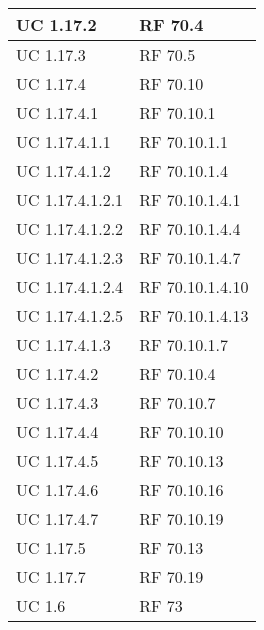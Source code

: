 {\begin{longtable} [c]{| p{4cm} | p{4cm} |}
 \hline 
UC 1.17.2 & RF 70.4\\ 
 \hline 
UC 1.17.3 & RF 70.5\\ 
 \hline 
UC 1.17.4 & RF 70.10\\ 
 \hline 
UC 1.17.4.1 & RF 70.10.1\\ 
 \hline 
UC 1.17.4.1.1 & RF 70.10.1.1\\ 
 \hline 
UC 1.17.4.1.2 & RF 70.10.1.4\\ 
 \hline 
UC 1.17.4.1.2.1 & RF 70.10.1.4.1\\ 
 \hline 
UC 1.17.4.1.2.2 & RF 70.10.1.4.4\\ 
 \hline 
UC 1.17.4.1.2.3 & RF 70.10.1.4.7\\ 
 \hline 
UC 1.17.4.1.2.4 & RF 70.10.1.4.10\\ 
 \hline 
UC 1.17.4.1.2.5 & RF 70.10.1.4.13\\ 
 \hline 
UC 1.17.4.1.3 & RF 70.10.1.7\\ 
 \hline 
UC 1.17.4.2 & RF 70.10.4\\ 
 \hline 
UC 1.17.4.3 & RF 70.10.7\\ 
 \hline 
UC 1.17.4.4 & RF 70.10.10\\ 
 \hline 
UC 1.17.4.5 & RF 70.10.13\\ 
 \hline 
UC 1.17.4.6 & RF 70.10.16\\ 
 \hline 
UC 1.17.4.7 & RF 70.10.19\\ 
 \hline 
UC 1.17.5 & RF 70.13\\ 
 \hline 
UC 1.17.7 & RF 70.19\\ 
 \hline 
UC 1.6 & RF 73\\ 
 \hline 
\end{longtable}}